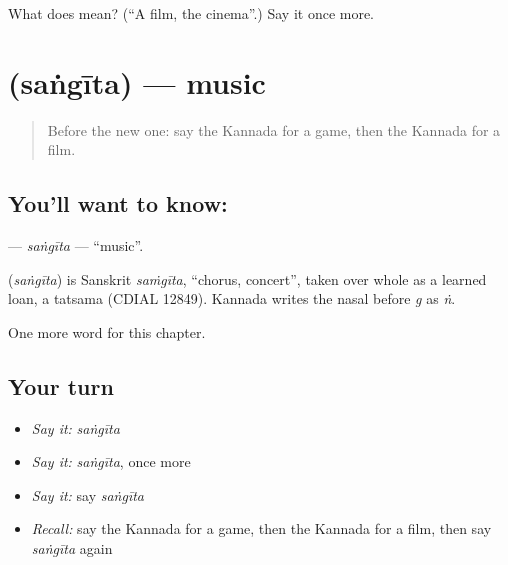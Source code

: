 \begin{tcolorbox}[breakable,colback=teal!4,colframe=teal!35!black,title={Before you move on}]
What does  mean? (\textquotedblleft{}A film, the cinema\textquotedblright{}.) Say it once more.
\end{tcolorbox}
\section[\texorpdfstring{\kn{ಸಂಗೀತ} (saṅgīta)}{ಸಂಗೀತ (saṅgīta)}]{ (saṅgīta) — music}

\label{lesson:KA-C298-sangita}



\begin{quote}
Before the new one: say the Kannada for a game, then the Kannada for a film.
\end{quote}

\subsection*{You'll want to know: }
\textbf{} — \emph{saṅgīta} — \textquotedblleft{}music\textquotedblright{}.

\begin{cousinweb}
\textbf{} (\emph{saṅgīta}) is Sanskrit \emph{saṁgīta}, \textquotedblleft{}chorus, concert\textquotedblright{}, taken over whole as a learned loan, a tatsama (CDIAL 12849). Kannada writes the nasal before \emph{g} as \emph{ṅ}.
\end{cousinweb}

\begin{grammarlens}[title={What you've built}]
One more word for this chapter.
\end{grammarlens}

\subsection*{Your turn}
\begin{itemize}
\raggedright
  \item \emph{Say it:} \emph{saṅgīta}
  \item \emph{Say it:} \emph{saṅgīta}, once more
  \item \emph{Say it:} say \emph{saṅgīta}
  \item \emph{Recall:} say the Kannada for a game, then the Kannada for a film, then say \emph{saṅgīta} again
\end{itemize}

